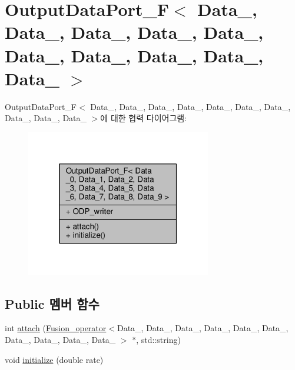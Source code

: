 \hypertarget{classOutputDataPort__F}{}\section{Output\+Data\+Port\+\_\+F$<$ Data\+\_, Data\+\_, Data\+\_, Data\+\_, Data\+\_, Data\+\_, Data\+\_, Data\+\_, Data\+\_, Data\+\_ $>$}
\label{classOutputDataPort__F}


Output\+Data\+Port\+\_\+F$<$ Data\+\_, Data\+\_, Data\+\_, Data\+\_, Data\+\_, Data\+\_, Data\+\_, Data\+\_, Data\+\_, Data\+\_ $>$에 대한 협력 다이어그램\+:\nopagebreak
\begin{figure}[H]
\begin{center}
\leavevmode
\includegraphics[width=229pt]{classOutputDataPort__F__coll__graph}
\end{center}
\end{figure}
\subsection*{Public 멤버 함수}
\begin{DoxyCompactItemize}
\item 
int \hyperlink{classOutputDataPort__F_a7a80d278d8aa04b8b884ab0f7753a528}{attach} (\hyperlink{classFusion__operator}{Fusion\+\_\+operator}$<$Data\+\_, Data\+\_, Data\+\_, Data\+\_, Data\+\_, Data\+\_, Data\+\_, Data\+\_, Data\+\_, Data\+\_ $>$ $\ast$, std\+::string)
\item 
void \hyperlink{classOutputDataPort__F_a08064705099380038f1a035f4bbdfd12}{initialize} (double rate)
\end{DoxyCompactItemize}
